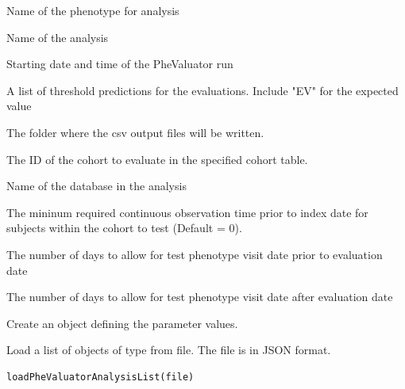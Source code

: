 \documentclass[a4paper]{book}
\begin{document}
\begin{Arguments}
\begin{ldescription}
\item[\code{phenotype}] Name of the phenotype for analysis

\item[\code{analysisName}] Name of the analysis

\item[\code{runDateTime}] Starting date and time of the PheValuator run

\item[\code{cutPoints}] A list of threshold predictions for the evaluations.  Include "EV" for
the expected value

\item[\code{exportFolder}] The folder where the csv output files will be written.

\item[\code{phenotypeCohortId}] The ID of the cohort to evaluate in the specified cohort table.

\item[\code{databaseId}] Name of the database in the analysis

\item[\code{washoutPeriod}] The mininum required continuous observation time prior to index date for
subjects within the cohort to test (Default = 0).

\item[\code{splayPrior}] The number of days to allow for test phenotype visit date prior to
evaluation date

\item[\code{splayPost}] The number of days to allow for test phenotype visit date after
evaluation date
\end{ldescription}
\end{Arguments}
%
\begin{Details}
Create an object defining the parameter values.
\end{Details}
%
\begin{Description}
Load a list of objects of type  from file. The file is in JSON format.
\end{Description}
%
\begin{Usage}
\begin{verbatim}
loadPheValuatorAnalysisList(file)
\end{verbatim}
\end{Usage}
\end{document}
